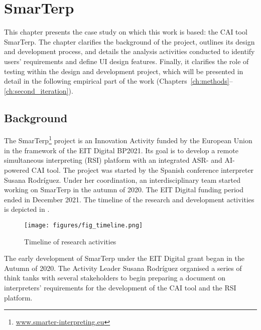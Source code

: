 \chapter{SmarTerp}\label{ch:smarterp}

This chapter presents the case study on which this work is based: the CAI tool SmarTerp. The chapter clarifies the background of the project, outlines its design and development process, and details the analysis activities conducted to identify users’ requirements and define UI design features. Finally, it clarifies the role of testing within the design and development project, which will be presented in detail in the following empirical part of the work (Chapters~\ref{ch:methods}--\ref{ch:second_iteration}).

\section{Background}

The SmarTerp\footnote{\url{www.smarter-interpreting.eu}} project is an Innovation Activity funded by the European Union in the framework of the EIT Digital BP2021. Its goal is to develop a remote simultaneous interpreting (RSI) platform with an integrated ASR- and AI-powered CAI tool. The project was started by the Spanish conference interpreter Susana Rodríguez. Under her coordination, an interdisciplinary team started working on SmarTerp in the autumn of 2020. The EIT Digital funding period ended in December 2021. The timeline of the research and development activities is depicted in .

\begin{figure}
    \texttt{[image: figures/fig\_timeline.png]}
    \caption{Timeline of research activities \label{fig:fig_timeline}}
\end{figure}

The early development of SmarTerp under the EIT Digital grant began in the Autumn of 2020. The Activity Leader Susana Rodríguez organised a series of think tanks with several stakeholders to begin preparing a document on interpreters' requirements for the development of the CAI tool and the RSI platform.

